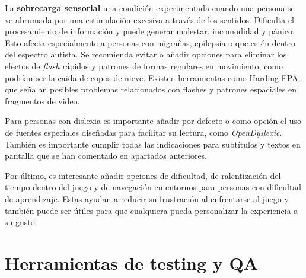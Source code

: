 La \textbf{sobrecarga sensorial} una condición experimentada cuando una persona se ve abrumada por una estimulación excesiva a través de los sentidos. Dificulta el procesamiento de información y puede generar malestar, incomodidad y pánico. Esto afecta especialmente a personas con migrañas, epilepsia o que estén dentro del espectro autista. Se recomienda evitar o añadir opciones para eliminar los efectos de \textit{flash} rápidos y patrones de formas regulares en movimiento, como podrían ser la caida de copos de nieve. Existen herramientas como \href{https://www.hardingfpa.com/}{Harding-FPA}, que señalan posibles problemas relacionados con flashes y patrones espaciales en fragmentos de video.

Para personas con dislexia es importante añadir por defecto o como opción el uso de fuentes especiales diseñadas para facilitar su lectura, como \textit{OpenDyslexic}. También es importante cumplir todas las indicaciones para subtítulos y textos en pantalla que se han comentado en apartados anteriores.

Por último, es interesante añadir opciones de dificultad, de ralentización del tiempo dentro del juego y de navegación en entornos para personas con dificultad de aprendizaje. Estas ayudan a reducir su frustración al enfrentarse al juego y también puede ser útiles para que cualquiera pueda personalizar la experiencia a su gusto.

\section{Herramientas de testing y QA}

